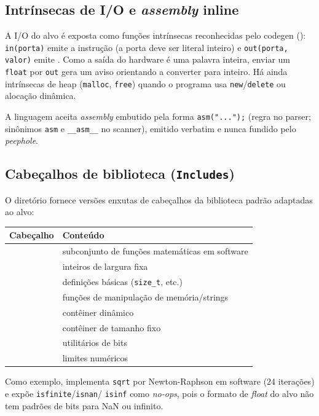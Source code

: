 \subsection{Intrínsecas de I/O e \emph{assembly} inline}

A I/O do alvo é exposta como funções intrínsecas reconhecidas pelo codegen
(): \lstinline|in(porta)| emite a instrução  (a porta
deve ser literal inteiro) e \lstinline|out(porta, valor)| emite . Como
a saída do hardware é uma palavra inteira, enviar um \lstinline|float| por
\lstinline|out| gera um aviso orientando a converter para inteiro. Há ainda
intrínsecas de heap (\lstinline|malloc|, \lstinline|free|) quando o programa usa
\lstinline|new|/\lstinline|delete| ou alocação dinâmica.

A linguagem aceita \emph{assembly} embutido pela forma
\lstinline|asm("...");| (regra  no parser; sinônimos
\lstinline|asm| e \lstinline|__asm__| no scanner), emitido verbatim e nunca
fundido pelo \emph{peephole}.

\subsection{Cabeçalhos de biblioteca (\texttt{Includes})}

O diretório  fornece versões enxutas de
cabeçalhos da biblioteca padrão adaptadas ao alvo:

\begin{tabularx}{\linewidth}{Y Y}
\toprule
\textbf{Cabeçalho} & \textbf{Conteúdo} \\
\midrule
{} & subconjunto de funções matemáticas em software \\
 & inteiros de largura fixa \\
 & definições básicas (\lstinline|size_t|, etc.) \\
 & funções de manipulação de memória/strings \\
 & contêiner dinâmico \\
 & contêiner de tamanho fixo \\
 & utilitários de bits \\
 & limites numéricos \\
\bottomrule
\end{tabularx}

Como exemplo,  implementa \lstinline|sqrt| por Newton-Raphson em
software (24 iterações) e expõe \lstinline|isfinite|/\lstinline|isnan|/%
\lstinline|isinf| como \emph{no-ops}, pois o formato de \emph{float} do alvo não
tem padrões de bits para NaN ou infinito.

